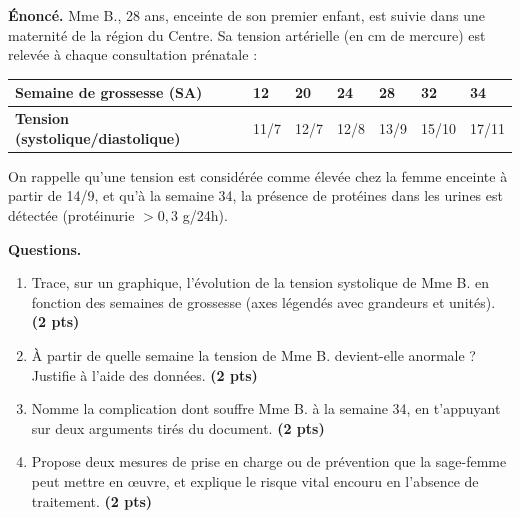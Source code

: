 \documentclass[11pt]{article}
\begin{document}
\begin{exercice}
\textbf{Énoncé.} Mme B., 28 ans, enceinte de son premier enfant, est suivie dans une maternité de la région du Centre. Sa tension artérielle (en cm de mercure) est relevée à chaque consultation prénatale :

\begin{center}
\begin{tabularx}{\linewidth}{|l|X|X|X|X|X|X|}
\hline
\rowcolor{popblueL} \textbf{Semaine de grossesse (SA)} & 12 & 20 & 24 & 28 & 32 & 34 \\
\hline \textbf{Tension (systolique/diastolique)} & 11/7 & 12/7 & 12/8 & 13/9 & 15/10 & 17/11 \\
\hline
\end{tabularx}
\end{center}

On rappelle qu'une tension est considérée comme élevée chez la femme enceinte à partir de 14/9, et qu'à la semaine 34, la présence de protéines dans les urines est détectée (protéinurie $> 0,3$ g/24h).

\medskip
\textbf{Questions.}
\begin{enumerate}
\item Trace, sur un graphique, l'évolution de la tension systolique de Mme B. en fonction des semaines de grossesse (axes légendés avec grandeurs et unités). \textbf{(2 pts)}
\item À partir de quelle semaine la tension de Mme B. devient-elle anormale ? Justifie à l'aide des données. \textbf{(2 pts)}
\item Nomme la complication dont souffre Mme B. à la semaine 34, en t'appuyant sur deux arguments tirés du document. \textbf{(2 pts)}
\item Propose deux mesures de prise en charge ou de prévention que la sage-femme peut mettre en œuvre, et explique le risque vital encouru en l'absence de traitement. \textbf{(2 pts)}
\end{enumerate}
\end{exercice}
\end{document}
